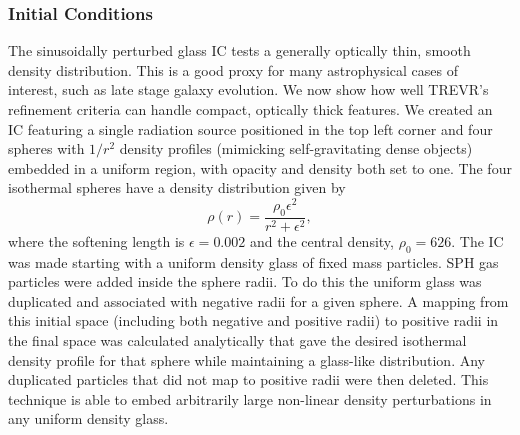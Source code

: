 \documentclass[fleq,usenatbib]{mnras}
\newcommand{\acro}{TREVR}
\begin{document}
{\subsubsection{Initial Conditions}
The sinusoidally perturbed glass IC tests a generally optically thin, smooth 
density distribution. This is a good proxy for many astrophysical cases of 
interest, such as late stage galaxy evolution. We now show how well \acro{}'s 
refinement criteria can handle compact, optically thick features. We created 
an IC featuring a single radiation source positioned in the top left corner 
and four spheres with $1/r^2$ density profiles (mimicking self-gravitating 
dense objects) embedded in a uniform region, with opacity and density both set 
to one. The four isothermal spheres have a density distribution given by
\begin{equation}
\rho(r) = \frac{\rho_0 \epsilon^2}{r^2 + \epsilon^2},
\end{equation}
where the softening length is $\epsilon=0.002$ and the central density, 
$\rho_0=626$. The IC was made starting with a uniform density glass of fixed 
mass particles. SPH gas particles were added inside the sphere radii. To do 
this the uniform glass was duplicated and associated with negative radii for a 
given sphere. A mapping from this initial space (including both negative and 
positive radii) to positive radii in the final space was calculated 
analytically that gave the desired isothermal density profile for that sphere
while maintaining a glass-like distribution. Any duplicated particles that did 
not map to positive radii were then deleted. This technique is able to embed 
arbitrarily large non-linear density perturbations in any uniform density 
glass.

}
\end{document}
